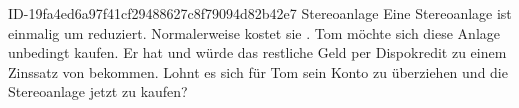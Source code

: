 \begin{exercise}
      {ID-19fa4ed6a97f41cf29488627c8f79094d82b42e7}
      {Stereoanlage}
  \ifproblem\problem
    Eine Stereoanlage ist einmalig um  reduziert. Normalerweise kostet
    sie . Tom möchte sich diese Anlage unbedingt kaufen. Er hat
     und würde das restliche Geld per Dispokredit zu einem Zinssatz
    von  bekommen. Lohnt es sich für Tom sein Konto zu überziehen und
    die Stereoanlage jetzt zu kaufen?
  \fi
\end{exercise}
